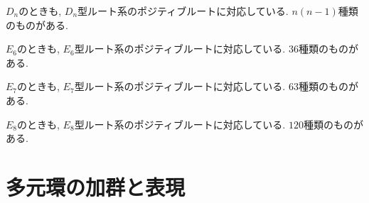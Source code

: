 \begin{example}
  $D_n$のときも,
  $D_n$型ルート系のポジティブルートに対応している.
  $n(n-1)$種類のものがある.
\end{example}
\begin{example}
  $E_6$のときも,
  $E_6$型ルート系のポジティブルートに対応している.
  $36$種類のものがある.
\end{example}
\begin{example}
  $E_7$のときも,
  $E_7$型ルート系のポジティブルートに対応している.
  $63$種類のものがある.
\end{example}
\begin{example}
  $E_8$のときも,
  $E_8$型ルート系のポジティブルートに対応している.
  $120$種類のものがある.
\end{example}

\chapter{多元環の加群と表現}




